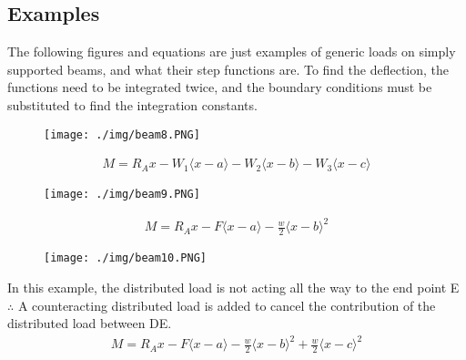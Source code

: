 \subsection{Examples}
The following figures and equations are just examples of generic loads on simply supported beams, and what their step functions are. To find the deflection, the functions need to be integrated twice, and the boundary conditions must be substituted to find the integration constants.
\begin{figure}[H]
  \centering
  \texttt{[image: ./img/beam8.PNG]}
\end{figure}
\begin{gather}
  M = R_Ax - W_1\langle x-a \rangle - W_2\langle x-b \rangle - W_3\langle x-c \rangle
\end{gather}
\begin{figure}[H]
  \centering
  \texttt{[image: ./img/beam9.PNG]}
\end{figure}
\begin{gather}
  M = R_Ax - F\langle x-a \rangle - \frac{w}{2}\langle x-b \rangle^2
\end{gather}
\begin{figure}[H]
  \centering
  \texttt{[image: ./img/beam10.PNG]}
\end{figure}
In this example, the distributed load is not acting all the way to the end point E $\therefore$ A counteracting distributed load is added to cancel the contribution of the distributed load between DE.
\begin{gather}
  M = R_Ax - F\langle x-a \rangle - \frac{w}{2}\langle x-b \rangle^2 + \frac{w}{2}\langle x-c \rangle^2
\end{gather}